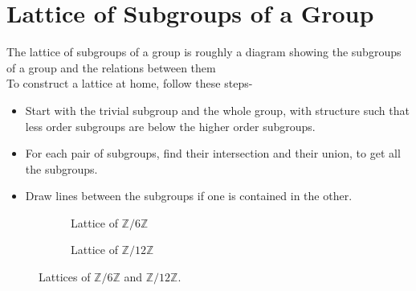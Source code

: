 \documentclass[12pt,a4paper,oneside]{report}
\theoremstyle{definition}
\begin{document}
\section{Lattice of Subgroups of a Group}
The lattice of subgroups of a group is roughly a diagram showing the subgroups of a group and the relations between them
\\To construct a lattice at home, follow these steps-
\begin{itemize}
  \item Start with the trivial subgroup and the whole group, with structure such that less order subgroups are below the higher order subgroups.
  \item For each pair of subgroups, find their intersection and their union, to get all the subgroups.
  \item Draw lines between the subgroups if one is contained in the other.
\end{itemize}
\begin{figure}[H]
  \centering
  \begin{subfigure}{0.45\textwidth}
    \centering
    \caption{Lattice of $\mathbb{Z}/6\mathbb{Z}$}
    \label{fig:lattice1}
  \end{subfigure}
  \hfill
  \begin{subfigure}{0.45\textwidth}
    \centering
    \caption{Lattice of $\mathbb{Z}/12\mathbb{Z}$}
    \label{fig:lattice2}
  \end{subfigure}
  \caption{Lattices of $\mathbb{Z}/6\mathbb{Z}$ and $\mathbb{Z}/12\mathbb{Z}$.}
  \label{fig:lattices}
\end{figure}
\appendix
\end{document}
